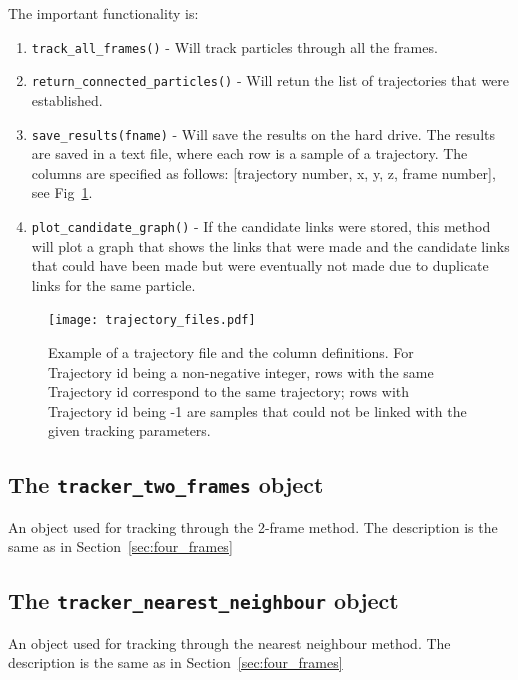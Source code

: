 \documentclass[10pt,a4paper]{article}
\begin{document}
The important functionality is:
%
\begin{enumerate}
	\item \texttt{track\_all\_frames()} - Will track particles through all the frames. 
	
	\item \texttt{return\_connected\_particles()} - Will retun the list of trajectories that were established.
	
	\item \texttt{save\_results(fname)} - Will save the results on the hard drive. The results are saved in a text file, where each row is a sample of a trajectory. The columns are specified as follows: [trajectory number, x, y, z, frame number], see Fig~\ref{fig:trajfile}.  
	
	\item \texttt{plot\_candidate\_graph()} - If the candidate links were stored, this method will plot a graph that shows the links that were made and the candidate links that could have been made but were eventually not made due to duplicate links for the same particle. 
\end{enumerate}

\begin{figure}
	\centering
	\texttt{[image: trajectory\_files.pdf]}
	\caption{Example of a trajectory file and the column definitions. For Trajectory id being a non-negative integer, rows with the same Trajectory id correspond to the same trajectory; rows with Trajectory id being -1 are samples that could not be linked with the given tracking parameters.  \label{fig:trajfile}}
\end{figure}




\subsection{The \texttt{tracker\_two\_frames} object}

An object used for tracking through the 2-frame method. The description is the same as in Section~\ref{sec:four_frames}



\subsection{The \texttt{tracker\_nearest\_neighbour} object}

An object used for tracking through the nearest neighbour method. The description is the same as in Section~\ref{sec:four_frames}
\end{document}
